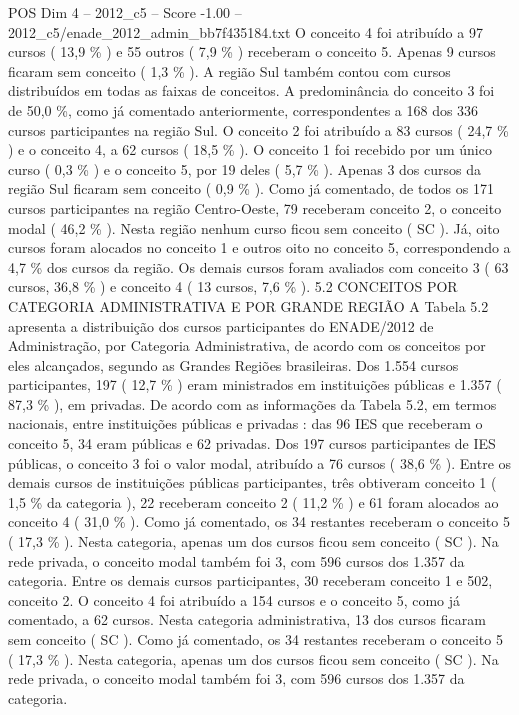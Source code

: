 \begin{textsample}{POS Dim 4 – 2012\_c5 – Score -1.00 – 2012\_c5/enade\_2012\_admin\_bb7f435184.txt}
O conceito 4 foi atribuído a 97 cursos ( 13,9 \% ) e 55 outros ( 7,9 \% ) receberam o conceito 5.
Apenas 9 cursos ficaram sem conceito ( 1,3 \% ).
A região Sul também contou com cursos distribuídos em todas as faixas de conceitos.
A predominância do conceito 3 foi de 50,0 \%, como já comentado anteriormente, correspondentes a 168 dos 336 cursos participantes na região Sul.
O conceito 2 foi atribuído a 83 cursos ( 24,7 \% ) e o conceito 4, a 62 cursos ( 18,5 \% ).
O conceito 1 foi recebido por um único curso ( 0,3 \% ) e o conceito 5, por 19 deles ( 5,7 \% ).
Apenas 3 dos cursos da região Sul ficaram sem conceito ( 0,9 \% ).
Como já comentado, de todos os 171 cursos participantes na região Centro-Oeste, 79 receberam conceito 2, o conceito modal ( 46,2 \% ).
Nesta região nenhum curso ficou sem conceito ( SC ).
Já, oito cursos foram alocados no conceito 1 e outros oito no conceito 5, correspondendo a 4,7 \% dos cursos da região.
Os demais cursos foram avaliados com conceito 3 ( 63 cursos, 36,8 \% ) e conceito 4 ( 13 cursos, 7,6 \% ). 5.2 CONCEITOS POR CATEGORIA ADMINISTRATIVA E POR GRANDE REGIÃO A Tabela 5.2 apresenta a distribuição dos cursos participantes do ENADE/2012 de Administração, por Categoria Administrativa, de acordo com os conceitos por eles alcançados, segundo as Grandes Regiões brasileiras.
Dos 1.554 cursos participantes, 197 ( 12,7 \% ) eram ministrados em instituições públicas e 1.357 ( 87,3 \% ), em privadas.
De acordo com as informações da Tabela 5.2, em termos nacionais, entre instituições públicas e privadas : das 96 IES que receberam o conceito 5, 34 eram públicas e 62 privadas.
Dos 197 cursos participantes de IES públicas, o conceito 3 foi o valor modal, atribuído a 76 cursos ( 38,6 \% ).
Entre os demais cursos de instituições públicas participantes, três obtiveram conceito 1 ( 1,5 \% da categoria ), 22 receberam conceito 2 ( 11,2 \% ) e 61 foram alocados ao conceito 4 ( 31,0 \% ).
Como já comentado, os 34 restantes receberam o conceito 5 ( 17,3 \% ).
Nesta categoria, apenas um dos cursos ficou sem conceito ( SC ).
Na rede privada, o conceito modal também foi 3, com 596 cursos dos 1.357 da categoria.
Entre os demais cursos participantes, 30 receberam conceito 1 e 502, conceito 2.
O conceito 4 foi atribuído a 154 cursos e o conceito 5, como já comentado, a 62 cursos.
Nesta categoria administrativa, 13 dos cursos ficaram sem conceito ( SC ).
Como já comentado, os 34 restantes receberam o conceito 5 ( 17,3 \% ).
Nesta categoria, apenas um dos cursos ficou sem conceito ( SC ).
Na rede privada, o conceito modal também foi 3, com 596 cursos dos 1.357 da categoria.

\end{textsample}
